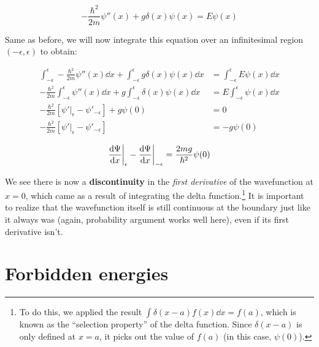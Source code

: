 \begin{equation*}
	-\frac{\hbar^2}{2m} \psi''(x) + g\delta(x) \psi(x) = E\psi(x)
\end{equation*}

Same as before, we will now integrate this equation over an infinitesimal region $(-\epsilon,\epsilon)$ to obtain:

\begin{align*}
	\int_{-\epsilon}^{\epsilon} -\frac{\hbar^2}{2m}  \psi''(x) \dd{x} + \int_{-\epsilon}^{\epsilon} g\delta(x) \psi(x) \dd{x} &= \int_{-\epsilon}^{\epsilon} E\psi(x) \dd{x} \\
	-\frac{\hbar^2}{2m} \int_{-\epsilon}^{\epsilon} \psi''(x) \dd{x} + g \int_{-\epsilon}^{\epsilon} \delta(x) \psi(x) \dd{x} &= E \int_{-\epsilon}^{\epsilon} \psi(x) \dd{x} \\
	-\frac{\hbar^2}{2m} \left[ \psi'|_{\epsilon} - \psi'_{-\epsilon} \right] + g \psi(0) &= 0 \\
	-\frac{\hbar^2}{2m} \left[ \psi'|_{\epsilon} - \psi'_{-\epsilon} \right] &= -g \psi(0)
\end{align*}

\begin{tcolorbox}[title = Continuity across the delta function potential] \vspace{-2ex}
	\begin{equation}
	\dv{\Psi}{x} \bigg|_{\epsilon} - \dv{\Psi}{x} \bigg|_{-\epsilon} = \frac{2mg}{\hbar^2}\psi(0) \label{eq:kp-cont}
	\end{equation}
\end{tcolorbox}

We see there is now a \textbf{discontinuity} in the \emph{first derivative} of the wavefunction at $x = 0$, which came as a result of integrating the delta function.\footnote{To do this, we applied the result $\int\delta(x-a)f(x) \dd{x} = f(a)$, which is known as the ``selection property'' of the delta function. Since $\delta(x-a)$ is only defined at $x=a$, it picks out the value of $f(a)$ (in this case, $\psi(0)$).} 
It is important to realize that the wavefunction itself is still continuous at the boundary just like it always was (again, probability argument works well here), even if its first derivative isn't.


\section{Forbidden energies}

